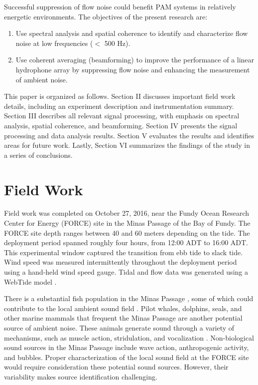 \documentclass[12pt,journal,onecolumn]{IEEEtran}
\begin{document}
Successful suppression of flow noise could benefit PAM systems in relatively energetic environments.
The objectives of the present research are: 
\begin{enumerate}
\item Use spectral analysis and spatial coherence to identify and characterize flow noise at low frequencies ($<$ 500 Hz).
\item Use coherent averaging (beamforming) to improve the performance of a linear hydrophone array by suppressing flow noise and enhancing the measurement of ambient noise. 
\end{enumerate}

This paper is organized as follows. Section II discusses important field work details, including an experiment description and instrumentation summary. Section III describes all relevant signal processing, with emphasis on spectral analysis, spatial coherence, and beamforming. Section IV presents the signal processing and data analysis results. Section V evaluates the results and identifies areas for future work. Lastly, Section VI summarizes the findings of the study in a series of conclusions.





\section{Field Work}
\label{II}

Field work was completed on October 27, 2016, near the Fundy Ocean Research Center for Energy (FORCE) site in the Minas Passage of the Bay of Fundy. The FORCE site depth ranges between 40 and 60 meters depending on the tide. The deployment period spanned roughly four hours, from 12:00 ADT to 16:00 ADT. This experimental window captured the transition from ebb tide to slack tide. Wind speed was measured intermittently throughout the deployment period using a hand-held wind speed gauge. Tidal and flow data was generated using a WebTide model \cite{webtide}. 

There is a substantial fish population in the Minas Passage \cite{dadswell}, some of which could contribute to the local ambient sound field \cite{wilson}. Pilot whales, dolphins, seals, and other marine mammals that frequent the Minas Passage are another potential source of ambient noise. These animals generate sound through a variety of mechanisms, such as muscle action, stridulation, and vocalization \cite{hilde}. Non-biological sound sources in the Minas Passage include wave action, anthropogenic activity, and bubbles. Proper characterization of the local sound field at the FORCE site would require consideration these potential sound sources. However, their variability makes source identification challenging. 
\end{document}
